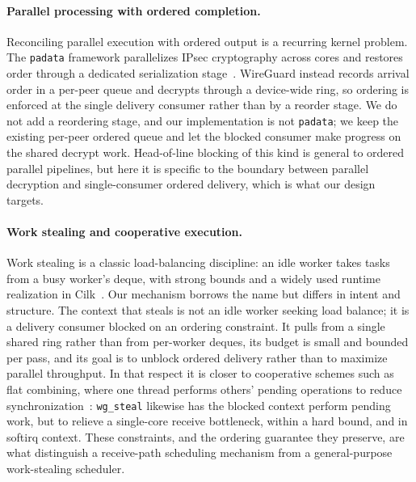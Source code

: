 \paragraph{Parallel processing with ordered completion.}
Reconciling parallel execution with ordered output is a recurring kernel
problem. The \texttt{padata} framework parallelizes IPsec cryptography across
cores and restores order through a dedicated serialization
stage~\cite{linux-padata}. WireGuard instead records arrival order in a per-peer
queue and decrypts through a device-wide ring, so ordering is enforced at the
single delivery consumer rather than by a reorder stage. We do not add a
reordering stage, and our implementation is not \texttt{padata}; we keep the
existing per-peer ordered queue and let the blocked consumer make progress on
the shared decrypt work. Head-of-line blocking of this kind is general to
ordered parallel pipelines, but here it is specific to the boundary between
parallel decryption and single-consumer ordered delivery, which is what our
design targets.

\paragraph{Work stealing and cooperative execution.}
Work stealing is a classic load-balancing discipline: an idle worker takes tasks
from a busy worker's deque, with strong bounds and a widely used runtime
realization in Cilk~\cite{blumofe1999,frigo1998cilk}. Our mechanism borrows the
name but differs in intent and structure. The context that steals is not an idle
worker seeking load balance; it is a delivery consumer blocked on an ordering
constraint. It pulls from a single shared ring rather than from per-worker
deques, its budget is small and bounded per pass, and its goal is to unblock
ordered delivery rather than to maximize parallel throughput. In that respect it
is closer to cooperative schemes such as flat combining, where one thread
performs others' pending operations to reduce
synchronization~\cite{hendler2010flat}: \texttt{wg\_steal} likewise has the
blocked context perform pending work, but to relieve a single-core receive
bottleneck, within a hard bound, and in softirq context. These constraints, and
the ordering guarantee they preserve, are what distinguish a receive-path
scheduling mechanism from a general-purpose work-stealing scheduler.
